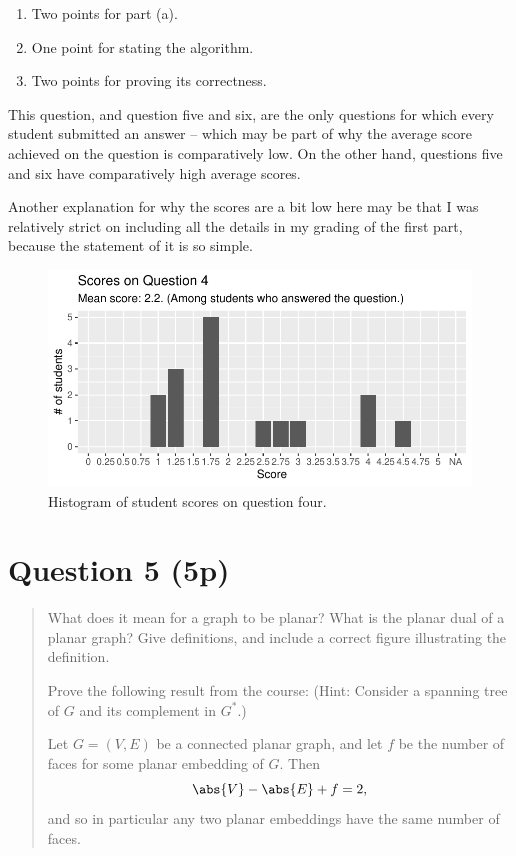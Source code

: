 \documentclass[nobib]{tufte-handout}
\begin{document}
\begin{enumerate}
  \item Two points for part (a).
  \item One point for stating the algorithm.
  \item Two points for proving its correctness.
\end{enumerate}

This question, and question five and six, are the only questions for which every student submitted an answer -- which may be part of why the average score achieved on the question is comparatively low. On the other hand, questions five and six have comparatively high average scores.

Another explanation for why the scores are a bit low here may be that I was relatively strict on including all the details in my grading of the first part, because the statement of it is so simple.

\begin{figure}[p]
  \centering
  \includegraphics[width = \textwidth]{Q4.pdf}
  \caption[Score histogram for Q4]{Histogram of student scores on question four.}
  \label{fig:Q4}
\end{figure}

\section{Question 5 (5p)} %

\begin{quotation}
  What does it mean for a graph to be planar? What is the planar dual of a planar graph? Give definitions, and include a correct figure illustrating the definition.

  Prove the following result from the course: (Hint: Consider a spanning tree of $G$ and its complement in $G^*$.)
  \begin{theorem}
    Let $G = (V,E)$ be a connected planar graph, and let $f$ be the number of faces for some planar embedding of $G$. Then
    $$\abs{V} - \abs{E} + f = 2,$$
    and so in particular any two planar embeddings have the same number of faces.
  \end{theorem}
\end{quotation}
\end{document}
